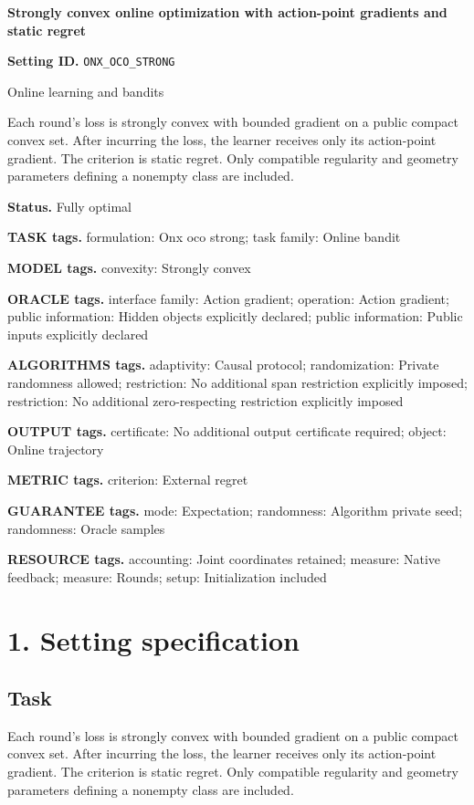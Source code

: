 \documentclass[10pt,a4paper]{article}
\begin{document}
\raggedright

{\LARGE\bfseries\sffamily\color{AtlasNavy} Strongly convex online optimization with action-point gradients and static regret\par}\vspace{5pt}
\textbf{Setting ID.} \texttt{ONX\_\allowbreak{}OCO\_\allowbreak{}STRONG}

Online learning and bandits

Each round's loss is strongly convex with bounded gradient on a public compact convex set. After incurring the loss, the learner receives only its action-point gradient. The criterion is static regret. Only compatible regularity and geometry parameters defining a nonempty class are included.

\textbf{Status.} Fully optimal

\textbf{TASK tags.} formulation: Onx oco strong; task family: Online bandit

\textbf{MODEL tags.} convexity: Strongly convex

\textbf{ORACLE tags.} interface family: Action gradient; operation: Action gradient; public information: Hidden objects explicitly declared; public information: Public inputs explicitly declared

\textbf{ALGORITHMS tags.} adaptivity: Causal protocol; randomization: Private randomness allowed; restriction: No additional span restriction explicitly imposed; restriction: No additional zero-respecting restriction explicitly imposed

\textbf{OUTPUT tags.} certificate: No additional output certificate required; object: Online trajectory

\textbf{METRIC tags.} criterion: External regret

\textbf{GUARANTEE tags.} mode: Expectation; randomness: Algorithm private seed; randomness: Oracle samples

\textbf{RESOURCE tags.} accounting: Joint coordinates retained; measure: Native feedback; measure: Rounds; setup: Initialization included

\section{1. Setting specification}
\subsection{Task}
Each round's loss is strongly convex with bounded gradient on a public compact convex set. After incurring the loss, the learner receives only its action-point gradient. The criterion is static regret. Only compatible regularity and geometry parameters defining a nonempty class are included.
\end{document}
